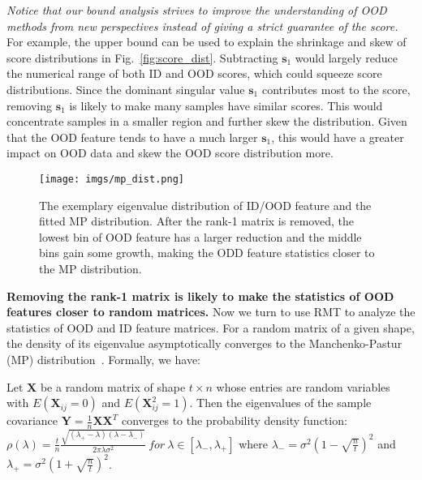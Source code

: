\emph{Notice that our bound analysis strives to improve the understanding of OOD methods from new perspectives instead of giving a strict guarantee of the score.} For example, the upper bound can be used to explain the shrinkage and skew of score distributions in Fig.~\ref{fig:score_dist}. Subtracting $\mathbf{s}_{1}$ would largely reduce the numerical range of both ID and OOD scores, which could squeeze score distributions. Since the dominant singular value $\mathbf{s}_{1}$ contributes most to the score, removing $\mathbf{s}_{1}$ is likely to make many samples have similar scores. This would concentrate samples in a smaller region and further skew the distribution. Given that the OOD feature tends to have a much larger $\mathbf{s}_{1}$, this would have a greater impact on OOD data and skew the OOD score distribution more.

\begin{figure}[htbp]
    \centering
    \texttt{[image: imgs/mp\_dist.png]}
    \caption{The exemplary eigenvalue distribution of ID/OOD feature and the fitted MP distribution. After the rank-1 matrix is removed, the lowest bin of OOD feature has a larger reduction and the middle bins gain some growth, making the ODD feature statistics closer to the MP distribution. }
    \label{fig:mp_dist}
\end{figure}

\noindent \textbf{Removing the rank-1 matrix is likely to make the statistics of OOD features closer to random matrices.} Now we turn to use RMT to analyze the statistics of OOD and ID feature matrices. For a random matrix of a given shape, the density of its eigenvalue asymptotically converges to the Manchenko-Pastur (MP) distribution~\cite{marvcenko1967distribution,sengupta1999distributions}. Formally, we have:
\begin{thm}
Let $\mathbf{X}$ be a random matrix of shape $t{\times}n$ whose entries are random variables with $E(\mathbf{X}_{ij}=0)$ and $E(\mathbf{X}_{ij}^2=1)$. Then the eigenvalues of the sample covariance $\mathbf{Y}=\frac{1}{n}\mathbf{X}\mathbf{X}^{T}$ converges to the probability density function: $\rho(\lambda) = \frac{t}{n} \frac{\sqrt{(\lambda_{+}-\lambda)(\lambda-\lambda_{-})}}{2\pi\lambda\sigma^2}\ for\  \lambda\in[\lambda_{-},\lambda_{+}]$ where $\lambda_{-}{=}\sigma^{2} (1-\sqrt{\frac{n}{t}})^2$ and $ \lambda_{+}{=}\sigma^{2} (1+\sqrt{\frac{n}{t}})^2$.
\end{thm}

